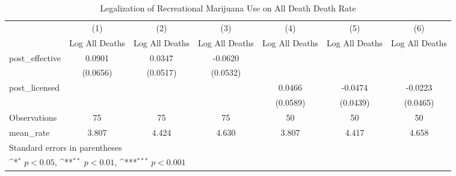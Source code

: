 \begin{table}[htbp]\centering
\def\sym#1{\ifmmode^{#1}\else\(^{#1}\)\fi}
\caption{Legalization of Recreational Marijuana Use on All Death Death Rate}
\begin{tabular}{l*{6}{c}}
\hline\hline
                    &\multicolumn{1}{c}{(1)}&\multicolumn{1}{c}{(2)}&\multicolumn{1}{c}{(3)}&\multicolumn{1}{c}{(4)}&\multicolumn{1}{c}{(5)}&\multicolumn{1}{c}{(6)}\\
                    &\multicolumn{1}{c}{Log All Deaths}&\multicolumn{1}{c}{Log All Deaths}&\multicolumn{1}{c}{Log All Deaths}&\multicolumn{1}{c}{Log All Deaths}&\multicolumn{1}{c}{Log All Deaths}&\multicolumn{1}{c}{Log All Deaths}\\
\hline
post\_effective      &      0.0901         &      0.0347         &     -0.0620         &                     &                     &                     \\
                    &    (0.0656)         &    (0.0517)         &    (0.0532)         &                     &                     &                     \\
[1em]
post\_licensed       &                     &                     &                     &      0.0466         &     -0.0474         &     -0.0223         \\
                    &                     &                     &                     &    (0.0589)         &    (0.0439)         &    (0.0465)         \\
\hline
Observations        &          75         &          75         &          75         &          50         &          50         &          50         \\
mean\_rate           &       3.807         &       4.424         &       4.630         &       3.807         &       4.417         &       4.658         \\
\hline\hline
\multicolumn{7}{l}{\footnotesize Standard errors in parentheses}\\
\multicolumn{7}{l}{\footnotesize \sym{*} \(p<0.05\), \sym{**} \(p<0.01\), \sym{***} \(p<0.001\)}\\
\end{tabular}
\end{table}
